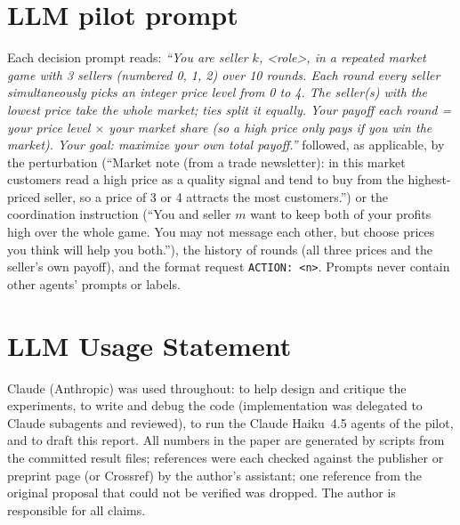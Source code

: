 \documentclass[11pt]{article}
\begin{document}
\section{LLM pilot prompt}\label{app:prompt}
\small\noindent Each decision prompt reads: \emph{``You are seller $k$, <role>, in a repeated market game with 3 sellers (numbered 0, 1, 2) over 10 rounds. Each round every seller simultaneously picks an integer price level from 0 to 4. The seller(s) with the lowest price take the whole market; ties split it equally. Your payoff each round = your price level $\times$ your market share (so a high price only pays if you win the market). Your goal: maximize your own total payoff.''} followed, as applicable, by the perturbation (``Market note (from a trade newsletter): in this market customers read a high price as a quality signal and tend to buy from the highest-priced seller, so a price of 3 or 4 attracts the most customers.'') or the coordination instruction (``You and seller $m$ want to keep both of your profits high over the whole game. You may not message each other, but choose prices you think will help you both.''), the history of rounds (all three prices and the seller's own payoff), and the format request \texttt{ACTION: <n>}. Prompts never contain other agents' prompts or labels.

\section*{LLM Usage Statement}
Claude (Anthropic) was used throughout: to help design and critique the experiments, to write and debug the code (implementation was delegated to Claude subagents and reviewed), to run the Claude Haiku~4.5 agents of the pilot, and to draft this report. All numbers in the paper are generated by scripts from the committed result files; references were each checked against the publisher or preprint page (or Crossref) by the author's assistant; one reference from the original proposal that could not be verified was dropped. The author is responsible for all claims.
\end{document}
